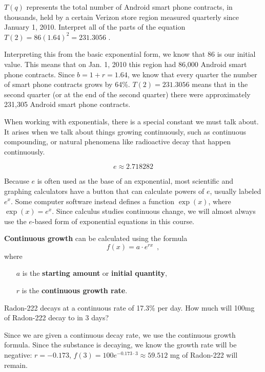 \begin{example}
$T(q)$ represents the total number of Android smart phone contracts, in thousands, held by a certain Verizon store region measured quarterly since January 1, 2010. Interpret all of the parts of the equation $T(2)=86(1.64)^2=231.3056$ .

\solution Interpreting this from the basic exponential form, we know that 86 is our initial value. This means that on Jan. 1, 2010 this region had 86,000 Android smart phone contracts. Since $b=1+r=1.64$, we know that every quarter the number of smart phone contracts grows by 64\%. $T(2)=231.3056$ means that in the second quarter (or at the end of the second quarter) there were approximately 231,305 Android smart phone contracts.
\end{example}

When working with exponentials, there is a special constant we must talk about. It arises when we talk about things growing continuously, such as continuous compounding, or natural phenomena like radioactive decay that happen continuously.

\begin{definition}
$$e\approx2.718282$$
\end{definition}
Because $e$ is often used as the base of an exponential, most scientific and graphing calculators have a button that can calculate powers of $e$, usually labeled $e^x$. Some computer software instead defines a function $\exp(x)$, where $\exp(x) = e^x$. Since calculus studies continuous change, we will almost always use the $e$-based form of exponential equations in this course.

\begin{definition}
{\bf Continuous growth} can be calculated using the formula
$$f(x)=a\cdot e^{rx} \enspace ,$$
where
\begin{itemize}
    \item[$a$] is the {\bf starting amount} or {\bf initial quantity},
    \item[$r$] is the {\bf continuous growth rate}.
\end{itemize}
\end{definition}

\begin{example}
Radon-222 decays at a continuous rate of 17.3\% per day. How much will 100mg of Radon-222 decay to in 3 days?

\solution Since we are given a continuous decay rate, we use the continuous growth formula. Since the substance is decaying, we know the growth rate will be negative: $r=-0.173$, $f(3)=100e^{-0.173\cdot 3}\approx 59.512$ mg of Radon-222 will remain.
\end{example}


